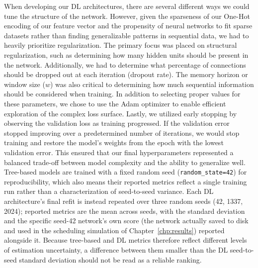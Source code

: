 \clearpage
When developing our DL architectures, there are several different ways we could tune the structure of the network. However, given the sparseness of our One-Hot encoding of our feature vector and the propensity of neural networks to fit sparse datasets rather than finding generalizable patterns in sequential data, we had to heavily prioritize regularization. The primary focus was placed on structural regularization, such as determining how many hidden units should be present in the network. Additionally, we had to determine what percentage of connections should be dropped out at each iteration (dropout rate). The memory horizon or window size ($w$) was also critical to determining how much sequential information should be considered when training. In addition to selecting proper values for these parameters, we chose to use the Adam optimizer to enable efficient exploration of the complex loss surface. Lastly, we utilized early stopping by observing the validation loss as training progressed. If the validation error stopped improving over a predetermined number of iterations, we would stop training and restore the model's weights from the epoch with the lowest validation error. This ensured that our final hyperparameters represented a balanced trade-off between model complexity and the ability to generalize well. Tree-based models are trained with a fixed random seed (\texttt{random\_state=42}) for reproducibility, which also means their reported metrics reflect a single training run rather than a characterization of seed-to-seed variance. Each DL architecture's final refit is instead repeated over three random seeds (42, 1337, 2024); reported metrics are the mean across seeds, with the standard deviation and the specific seed-42 network's own score (the network actually saved to disk and used in the scheduling simulation of Chapter~\ref{chp:results}) reported alongside it. Because tree-based and DL metrics therefore reflect different levels of estimation uncertainty, a difference between them smaller than the DL seed-to-seed standard deviation should not be read as a reliable ranking.

